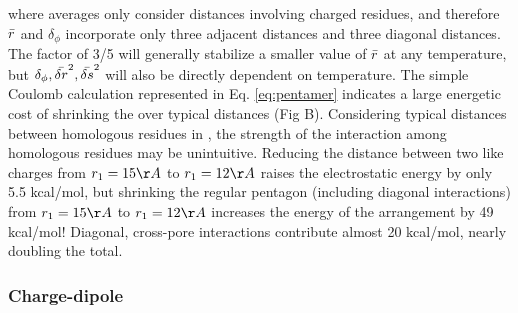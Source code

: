 \documentclass[9pt,twocolumn,twoside,lineno]{pnas-new}
\begin{document}
where averages only consider distances involving charged residues, and therefore $\bar{r}$ and $\delta_{\phi}$ incorporate only three adjacent distances and three diagonal distances.  The factor of 3/5 will generally stabilize a smaller value of $\bar{r}$ at any temperature, but $\delta_{\phi}, \bar{\delta r}^{2}, \bar{\delta s}^{2}$ will also be directly dependent on temperature. 
The simple Coulomb calculation represented in Eq. \ref{eq:pentamer} indicates a large energetic cost of shrinking the \fiveringnos over typical distances (Fig \sFigEnergy B).  Considering typical distances between homologous residues in \plgics, the strength of the interaction among homologous residues may be unintuitive.  %
Reducing the distance between two like charges from $r_{1}=15\AA$ to $r_{1}=12\AA$ raises the electrostatic energy by only 5.5 kcal/mol, but shrinking the regular pentagon (including diagonal interactions) from $r_{1}=15\AA$ to $r_{1}=12\AA$ increases the energy of the arrangement by 49 kcal/mol!  Diagonal, cross-pore interactions contribute almost 20 kcal/mol, nearly doubling the total.  
\subsubsection*{Charge-dipole}
\end{document}

